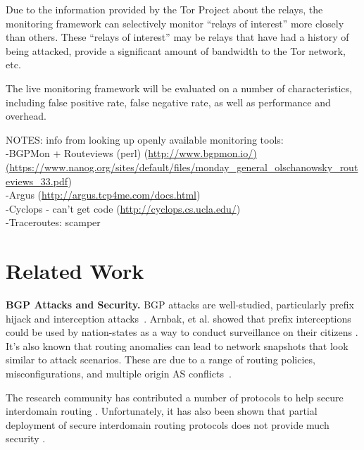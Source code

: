\documentclass{acm_proc_article-sp}
\begin{document}
Due to the information provided by the Tor Project about the relays, the monitoring framework can selectively monitor ``relays of interest'' more closely than others.  These ``relays of interest'' may be relays that have had a history of being attacked, provide a significant amount of bandwidth to the Tor network, etc.

The live monitoring framework will be evaluated on a number of characteristics, including false positive rate, false negative rate, as well as performance and overhead.

NOTES: info from looking up openly available monitoring tools:\\
  -BGPMon + Routeviews (perl) (\url{http://www.bgpmon.io/)(https://www.nanog.org/sites/default/files/monday_general_olschanowsky_routeviews_33.pdf})\\
  -Argus (\url{http://argus.tcp4me.com/docs.html})\\
  -Cyclops - can't get code (\url{http://cyclops.cs.ucla.edu/})\\
  -Traceroutes: scamper

\section{Related Work}

{\bf BGP Attacks and Security.}
BGP attacks are well-studied, particularly prefix hijack and interception attacks~\cite{ballani2007study, mcarthur2009stealthy, zhang2012studying}.  Arnbak, et al. showed that prefix interceptions could be used by nation-states as a way to conduct surveillance on their citizens \cite{arnbak2014loopholes}.  It's also known that routing anomalies can lead to network snapshots that look similar to attack scenarios.  These are due to a range of routing policies, misconfigurations, and multiple origin AS conflicts~\cite{caesar2005bgp, mahajan2002understanding, zhao2001analysis}.  

The research community has contributed a number of protocols to help secure interdomain routing \cite{boldyreva2012provable, chan2006modeling, gill2011let, hu2004spv, zhang2009hc, van2007interdomain}.  Unfortunately, it has also been shown that partial deployment of secure interdomain routing protocols does not provide much security \cite{lychev2013bgp}.
\end{document}
